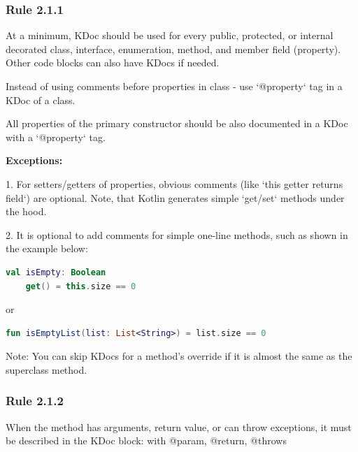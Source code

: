 \subsubsection*{\textbf{Rule 2.1.1}}
\leavevmode\newline



At a minimum, KDoc should be used for every public, protected, or internal decorated class, interface, enumeration, method, and member field (property). Other code blocks can also have KDocs if needed.

Instead of using comments before properties in class - use `@property` tag in a KDoc of a class.

All properties of the primary constructor should be also documented in a KDoc with a `@property` tag.



\textbf{Exceptions:}



1. For setters/getters of properties, obvious comments (like `this getter returns field`) are optional. Note, that Kotlin generates simple `get/set` methods under the hood.



2. It is optional to add comments for simple one-line methods, such as shown in the example below:

\begin{lstlisting}[language=Kotlin]
val isEmpty: Boolean
    get() = this.size == 0
\end{lstlisting}


or



\begin{lstlisting}[language=Kotlin]
fun isEmptyList(list: List<String>) = list.size == 0
\end{lstlisting}


Note: You can skip KDocs for a method's override if it is almost the same as the superclass method.

\subsubsection*{\textbf{Rule 2.1.2}}
\leavevmode\newline

When the method has arguments, return value, or can throw exceptions, it must be described in the KDoc block: with @param, @return, @throws



